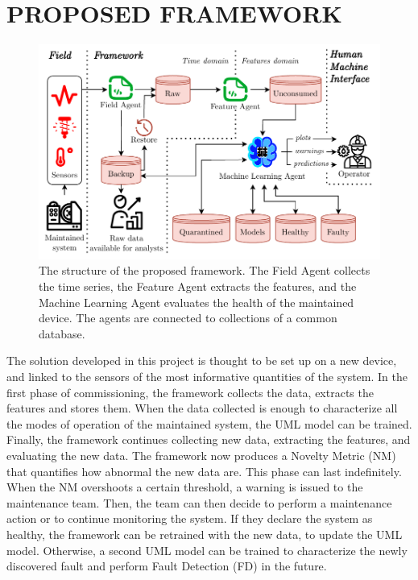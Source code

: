 \section{PROPOSED FRAMEWORK}
\label{sec:framework}
\begin{figure}
    \includegraphics[width=\linewidth]{images/Framework_structure.pdf}
    \caption{The structure of the proposed framework. The Field Agent collects the time series, the Feature Agent extracts the features, and the Machine Learning Agent evaluates the health of the maintained device. The agents are connected to collections of a common database.}
    \label{fig:framework_structure}
\end{figure}

The solution developed in this project is thought to be set up on a new device, and linked to the sensors of the most informative quantities of the system.
In the first phase of commissioning, the framework collects the data, extracts the features and stores them. When the data collected is enough to characterize all the modes of operation of the maintained system, the UML model can be trained. Finally, the framework continues collecting new data, extracting the features, and evaluating the new data. The framework now produces a Novelty Metric (NM) that quantifies how abnormal the new data are. 
This phase can last indefinitely. When the NM overshoots a certain threshold, a warning is issued to the maintenance team. 
Then, the team can then decide to perform a maintenance action or to continue monitoring the system. If they declare the system as healthy, the framework can be retrained with the new data, to update the UML model. Otherwise, a second UML model can be trained to characterize the newly discovered fault and perform Fault Detection (FD) in the future.

